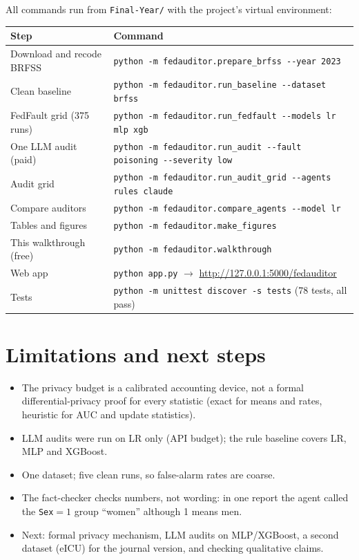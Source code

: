 \documentclass[11pt,a4paper]{article}
\begin{document}
All commands run from \texttt{Final-Year/} with the project's virtual environment:
\begin{center}\footnotesize
\begin{tabular}{ll}
\toprule
Step & Command \\
\midrule
Download and recode BRFSS & \texttt{python -m fedauditor.prepare\_brfss -{}-year 2023} \\
Clean baseline & \texttt{python -m fedauditor.run\_baseline -{}-dataset brfss} \\
FedFault grid (375 runs) & \texttt{python -m fedauditor.run\_fedfault -{}-models lr mlp xgb} \\
One LLM audit (paid) & \texttt{python -m fedauditor.run\_audit -{}-fault poisoning -{}-severity low} \\
Audit grid & \texttt{python -m fedauditor.run\_audit\_grid -{}-agents rules claude} \\
Compare auditors & \texttt{python -m fedauditor.compare\_agents -{}-model lr} \\
Tables and figures & \texttt{python -m fedauditor.make\_figures} \\
This walkthrough (free) & \texttt{python -m fedauditor.walkthrough} \\
Web app & \texttt{python app.py} $\to$ \url{http://127.0.0.1:5000/fedauditor} \\
Tests & \texttt{python -m unittest discover -s tests} (78 tests, all pass) \\
\bottomrule
\end{tabular}
\end{center}

\section{Limitations and next steps}
\begin{itemize}
\item The privacy budget is a calibrated accounting device, not a formal differential-privacy proof
  for every statistic (exact for means and rates, heuristic for AUC and update statistics).
\item LLM audits were run on LR only (API budget); the rule baseline covers LR, MLP and XGBoost.
\item One dataset; five clean runs, so false-alarm rates are coarse.
\item The fact-checker checks numbers, not wording: in one report the agent called the \texttt{Sex}$=1$
  group ``women'' although 1 means men.
\item Next: formal privacy mechanism, LLM audits on MLP/XGBoost, a second dataset (eICU) for the
  journal version, and checking qualitative claims.
\end{itemize}
\end{document}
